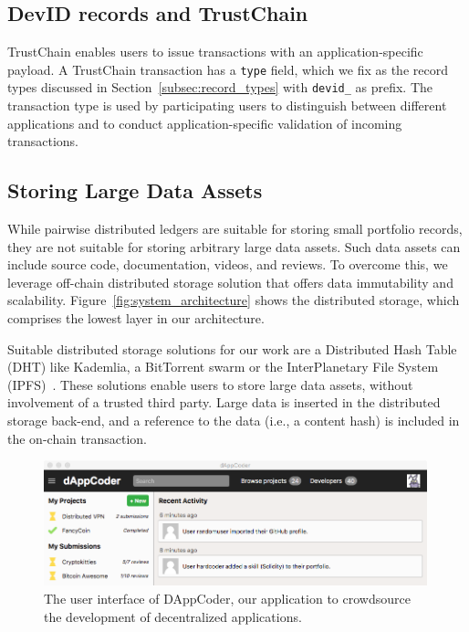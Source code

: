 \subsection{DevID records and TrustChain}
TrustChain enables users to issue transactions with an application-specific payload.
A TrustChain transaction has a \texttt{type} field, which we fix as the record types discussed in Section~\ref{subsec:record_types} with \texttt{devid\_} as prefix.
The transaction type is used by participating users to distinguish between different applications and to conduct application-specific validation of incoming transactions.


\subsection{Storing Large Data Assets}
While pairwise distributed ledgers are suitable for storing small portfolio records, they are not suitable for storing arbitrary large data assets.
Such data assets can include source code, documentation, videos, and reviews.
To overcome this, we leverage off-chain distributed storage solution that offers data immutability and scalability.
Figure~\ref{fig:system_architecture} shows the distributed storage, which comprises the lowest layer in our architecture.

Suitable distributed storage solutions for our work are a Distributed Hash Table (DHT) like Kademlia, a BitTorrent swarm or the InterPlanetary File System (IPFS)~\cite{maymounkov2002kademlia,cohen2008bittorrent,benet2014ipfs}.
These solutions enable users to store large data assets, without involvement of a trusted third party.
Large data is inserted in the distributed storage back-end, and a reference to the data (i.e., a content hash) is included in the on-chain transaction.

\begin{figure}[t!]
	\centering
	\includegraphics[width=0.99\textwidth]{devid/resources/gui_smaller.png}
	\caption{The user interface of DAppCoder, our application to crowdsource the development of decentralized applications.}
	\label{fig:dappcoder}
\end{figure}


